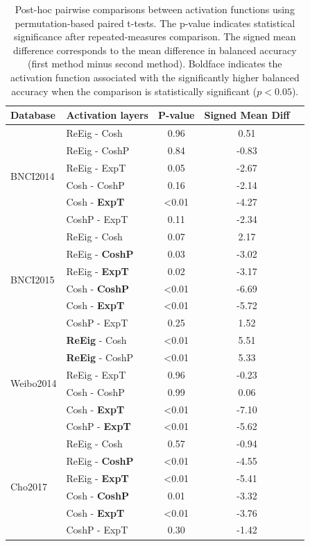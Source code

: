 \documentclass[11pt,a4paper]{article}
\begin{document}
\begin{table}[H]
\centering
\caption{Post-hoc pairwise comparisons between activation functions using permutation-based paired t-tests. The p-value indicates statistical significance after repeated-measures comparison. The signed mean difference corresponds to the mean difference in balanced accuracy (first method minus second method). Boldface indicates the activation function associated with the significantly higher balanced accuracy when the comparison is statistically significant ($p < 0.05$).}
\begin{tabular}{|l|l|c|c|c|}
\hline
\textbf{Database} & \textbf{Activation layers} & \textbf{P-value} & \textbf{Signed Mean Diff}\\
\hline
\multirow{6}{*}{BNCI2014}
& ReEig - Cosh   & 0.96 & 0.51  \\
& ReEig - CoshP  & 0.84 & -0.83  \\
& ReEig - ExpT & 0.05 & -2.67  \\
& Cosh - CoshP   & 0.16 & -2.14  \\
& Cosh - \textbf{ExpT}  & <0.01 & -4.27 \\
& CoshP - ExpT &  0.11 & -2.34  \\
\hline
\multirow{6}{*}{BNCI2015}
& ReEig - Cosh   & 0.07 & 2.17  \\
& ReEig - \textbf{CoshP}  & 0.03 & -3.02  \\
& ReEig - \textbf{ExpT} & 0.02 & -3.17  \\
& Cosh - \textbf{CoshP}   & <0.01 & -6.69 \\
& Cosh - \textbf{ExpT}  & <0.01 & -5.72  \\
& CoshP - ExpT & 0.25 & 1.52  \\
\hline
\multirow{6}{*}{Weibo2014}
& \textbf{ReEig} - Cosh   & <0.01  & 5.51   \\
& \textbf{ReEig} - CoshP  &  <0.01 & 5.33   \\
& ReEig - ExpT & 0.96   & -0.23   \\
& Cosh - CoshP   &  0.99  & 0.06   \\
& Cosh - \textbf{ExpT}  & <0.01  & -7.10   \\
& CoshP - \textbf{ExpT} & <0.01  & -5.62   \\
\hline
\multirow{6}{*}{Cho2017}
& ReEig - Cosh   & 0.57  & -0.94   \\
& ReEig - \textbf{CoshP}  & <0.01 & -4.55   \\
& ReEig - \textbf{ExpT} & <0.01  & -5.41   \\
& Cosh - \textbf{CoshP}   & 0.01  & -3.32   \\
& Cosh - \textbf{ExpT}  & <0.01  & -3.76   \\
& CoshP - ExpT & 0.30  & -1.42  \\
\hline
\end{tabular}
\label{tab:posthoc}
\end{table}
\end{document}
